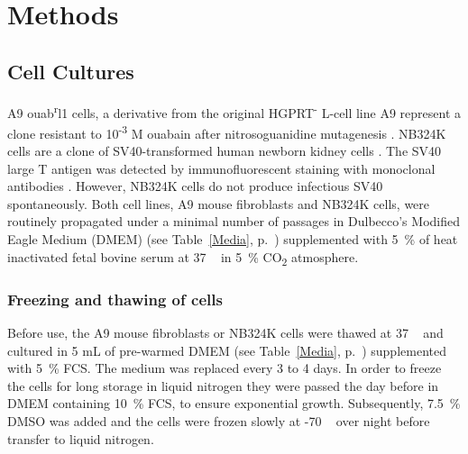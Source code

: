 
\chapter{Methods} %

\label{ChapterX} %



\section{Cell Cultures}
A9 ouab\textsuperscript{r}l1 cells, a derivative from the original HGPRT\textsuperscript{-} L-cell line A9 represent a clone resistant to 10\textsuperscript{-3} M ouabain after nitrosoguanidine mutagenesis \cite{pmid14213660}.
NB324K cells are a clone of SV40-transformed  human newborn kidney cells \cite{pmid13911591}. The SV40 large T antigen was detected by immunofluorescent  staining with monoclonal antibodies \cite{pmid6169844}.  However, NB324K cells do not produce infectious SV40 spontaneously.
Both cell lines, A9 mouse fibroblasts and NB324K cells, were routinely propagated under a minimal number of passages in Dulbecco's Modified Eagle Medium (DMEM) (see Table~\ref{Media}, p.~\pageref{Media}) supplemented with 5~\% of heat inactivated fetal bovine serum at 37 \textcelsius~ in 5~\% CO\textsubscript{2} atmosphere.  


\subsection{Freezing and thawing of cells}
Before use, the A9 mouse fibroblasts or NB324K cells were thawed at 37 \textcelsius~ and cultured in 5 mL of pre-warmed DMEM (see Table~\ref{Media}, p.~\pageref{Media}) supplemented with 5~\% FCS. The medium was replaced every 3 to 4 days. 
In order to freeze the cells for long storage in liquid nitrogen they were passed the day before in DMEM containing 10~\% FCS, to ensure exponential growth. Subsequently, 7.5~\% DMSO was added and the cells were frozen slowly at -70 \textcelsius~ over night before transfer to liquid nitrogen.

